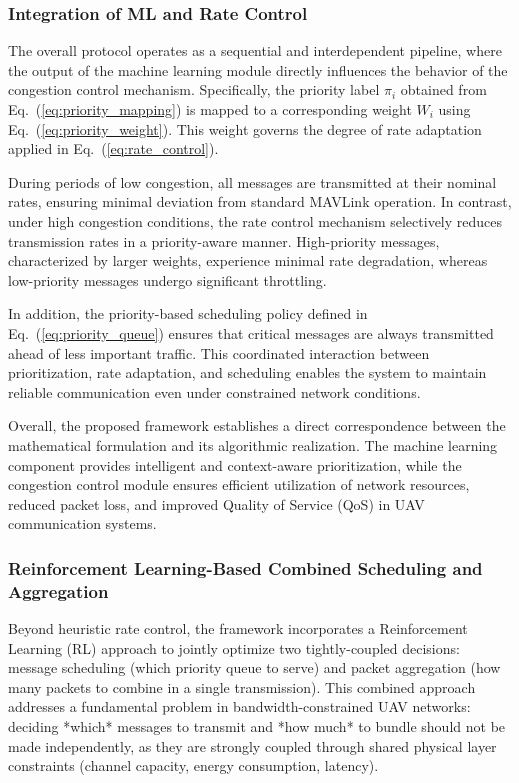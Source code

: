 \documentclass[pdflatex,sn-mathphys-num]{sn-jnl}%
\theoremstyle{thmstyleone}%
\theoremstyle{thmstyletwo}%
\theoremstyle{thmstylethree}%
\begin{document}
\subsubsection{ Integration of ML and Rate Control }

The overall protocol operates as a sequential and interdependent pipeline, where the output of the machine learning module directly influences the behavior of the congestion control mechanism. Specifically, the priority label $\pi_i$ obtained from Eq.~(\ref{eq:priority_mapping}) is mapped to a corresponding weight $W_i$ using Eq.~(\ref{eq:priority_weight}). This weight governs the degree of rate adaptation applied in Eq.~(\ref{eq:rate_control}).

During periods of low congestion, all messages are transmitted at their nominal rates, ensuring minimal deviation from standard MAVLink operation. In contrast, under high congestion conditions, the rate control mechanism selectively reduces transmission rates in a priority-aware manner. High-priority messages, characterized by larger weights, experience minimal rate degradation, whereas low-priority messages undergo significant throttling.

In addition, the priority-based scheduling policy defined in Eq.~(\ref{eq:priority_queue}) ensures that critical messages are always transmitted ahead of less important traffic. This coordinated interaction between prioritization, rate adaptation, and scheduling enables the system to maintain reliable communication even under constrained network conditions.

Overall, the proposed framework establishes a direct correspondence between the mathematical formulation and its algorithmic realization. The machine learning component provides intelligent and context-aware prioritization, while the congestion control module ensures efficient utilization of network resources, reduced packet loss, and improved Quality of Service (QoS) in UAV communication systems.

\subsubsection{ Reinforcement Learning-Based Combined Scheduling and Aggregation }

Beyond heuristic rate control, the framework incorporates a Reinforcement Learning (RL) approach to jointly optimize two tightly-coupled decisions: message scheduling (which priority queue to serve) and packet aggregation (how many packets to combine in a single transmission). This combined approach addresses a fundamental problem in bandwidth-constrained UAV networks: deciding *which* messages to transmit and *how much* to bundle should not be made independently, as they are strongly coupled through shared physical layer constraints (channel capacity, energy consumption, latency).
\end{document}
